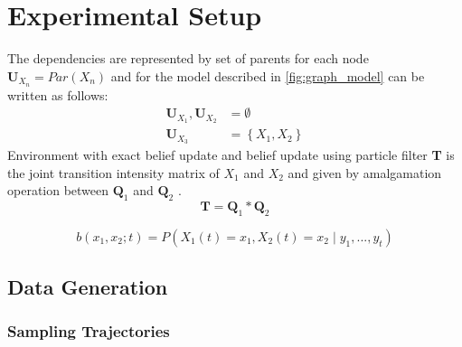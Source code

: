 \chapter{Experimental Setup}
The dependencies are represented by set of parents for each node $ \textbf{U}_{X_{n}} = Par(X_n) $ and for the model described in \autoref{fig:graph_model} can be written as follows:
\begin{align*}
\textbf{U}_{X_{1}}, \textbf{U}_{X_{2}} & = \emptyset \\
\textbf{U}_{X_{3}} & = \left\lbrace X_1, X_2 \right\rbrace 
\end{align*}
Environment with exact belief update and belief update using particle filter
\textbf{T} is the joint transition intensity matrix of $ X_{1} $ and $ X_{2} $ and given by amalgamation operation between $ \textbf{Q}_{1} $ and  $ \textbf{Q}_{2} $ \cite{Nodelman1995}.
\begin{equation}
\textbf{T} = \textbf{Q}_{1} * \textbf{Q}_{2}
\end{equation}

\begin{equation}
b(x_{1}, x_{2}; t) = P( X_{1}(t) = x_{1},  X_{2}(t) = x_{2}\mid y_{1}, ..., y_{t})
\end{equation}


\section{Data Generation}
\subsection{Sampling Trajectories}
